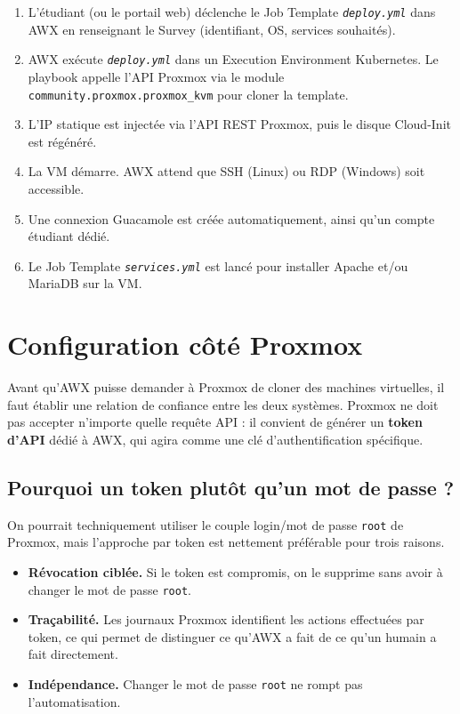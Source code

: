 \documentclass[a4paper]{article}
\newcommand{\cmd}[1]{\texttt{#1}}
\newcommand{\file}[1]{\texttt{\textit{#1}}}
\begin{document}
\begin{enumerate}
  \item L'étudiant (ou le portail web) déclenche le Job Template \file{deploy.yml} dans AWX en renseignant le Survey (identifiant, OS, services souhaités).
  \item AWX exécute \file{deploy.yml} dans un Execution Environment Kubernetes. Le playbook appelle l'API Proxmox via le module \cmd{community.proxmox.proxmox\_kvm} pour cloner la template.
  \item L'IP statique est injectée via l'API REST Proxmox, puis le disque Cloud-Init est régénéré.
  \item La VM démarre. AWX attend que SSH (Linux) ou RDP (Windows) soit accessible.
  \item Une connexion Guacamole est créée automatiquement, ainsi qu'un compte étudiant dédié.
  \item Le Job Template \file{services.yml} est lancé pour installer Apache et/ou MariaDB sur la VM.
\end{enumerate}


\section{Configuration côté Proxmox}

Avant qu'AWX puisse demander à Proxmox de cloner des machines virtuelles, il faut établir une relation de confiance entre les deux systèmes. Proxmox ne doit pas accepter n'importe quelle requête API : il convient de générer un \textbf{token d'API} dédié à AWX, qui agira comme une clé d'authentification spécifique.

\subsection{Pourquoi un token plutôt qu'un mot de passe ?}

On pourrait techniquement utiliser le couple login/mot de passe \cmd{root} de Proxmox, mais l'approche par token est nettement préférable pour trois raisons.

\begin{itemize}
  \item \textbf{Révocation ciblée.} Si le token est compromis, on le supprime sans avoir à changer le mot de passe \cmd{root}.
  \item \textbf{Traçabilité.} Les journaux Proxmox identifient les actions effectuées par token, ce qui permet de distinguer ce qu'AWX a fait de ce qu'un humain a fait directement.
  \item \textbf{Indépendance.} Changer le mot de passe \cmd{root} ne rompt pas l'automatisation.
\end{itemize}
\end{document}

